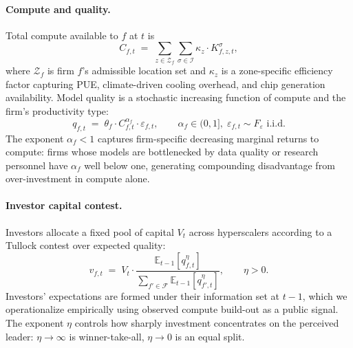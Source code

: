 \documentclass[12pt,letterpaper]{article}
\begin{document}
\paragraph{Compute and quality.} Total compute available to $f$ at $t$ is
\begin{equation}
\label{eq:compute}
C_{f,t} \;=\; \sum_{z \in \mathcal{Z}_f}\sum_{\sigma \in \mathcal{I}}
\kappa_z \cdot K_{f,z,t}^\sigma,
\end{equation}
where $\mathcal{Z}_f$ is firm $f$'s admissible location set and $\kappa_z$
is a zone-specific efficiency factor capturing PUE, climate-driven cooling
overhead, and chip generation availability. Model quality is a stochastic
increasing function of compute and the firm's productivity type:
\begin{equation}
\label{eq:quality}
q_{f,t} \;=\; \theta_f \cdot C_{f,t}^{\alpha_f} \cdot \varepsilon_{f,t},
\qquad \alpha_f \in (0,1],\; \varepsilon_{f,t} \sim F_\varepsilon \text{ i.i.d.}
\end{equation}
The exponent $\alpha_f < 1$ captures firm-specific decreasing marginal
returns to compute: firms whose models are bottlenecked by data quality or
research personnel have $\alpha_f$ well below one, generating compounding
disadvantage from over-investment in compute alone.

\paragraph{Investor capital contest.} Investors allocate a fixed pool of
capital $V_t$ across hyperscalers according to a Tullock contest over
expected quality:
\begin{equation}
\label{eq:contest}
v_{f,t} \;=\; V_t \cdot
\frac{\mathbb{E}_{t-1}[q_{f,t}^\eta]}{\sum_{f' \in \mathcal{F}} \mathbb{E}_{t-1}[q_{f',t}^\eta]},
\qquad \eta > 0.
\end{equation}
Investors' expectations are formed under their information set at $t-1$,
which we operationalize empirically using observed compute build-out as a
public signal. The exponent $\eta$ controls how sharply investment
concentrates on the perceived leader: $\eta \to \infty$ is winner-take-all,
$\eta \to 0$ is an equal split.
\end{document}
